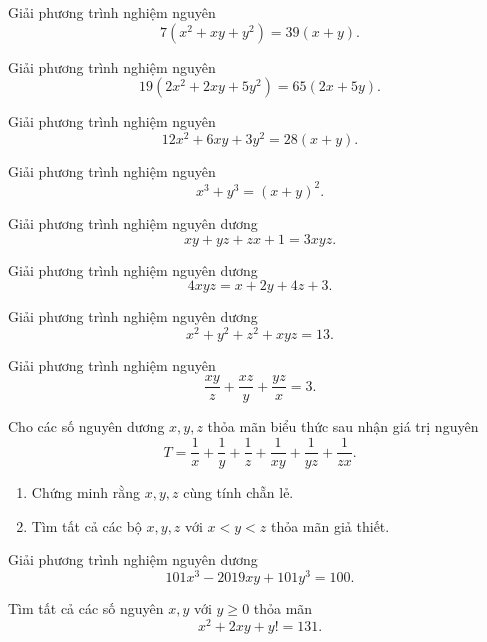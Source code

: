 \begin{btt}
Giải phương trình nghiệm nguyên
$$7\left(x^2+xy+y^2\right)=39\left(x+y\right).$$
\end{btt}

\begin{btt}
Giải phương trình nghiệm nguyên
$$19\left(2x^2+2xy+5y^2\right)=65\left(2x+5y\right).$$
\end{btt}

\begin{btt}
Giải phương trình nghiệm nguyên $$12x^2+6xy+3y^2=28(x+y).$$
\end{btt}

\begin{btt}
Giải phương trình nghiệm nguyên $$x^3+y^3=(x+y)^2.$$
\end{btt}

\begin{btt}
Giải phương trình nghiệm nguyên dương
$$xy+yz+zx+1=3xyz.$$
\end{btt}

\begin{btt}
Giải phương trình nghiệm nguyên dương
\[4xyz=x+2y+4z+3.\]
\end{btt}

\begin{btt}
Giải phương trình nghiệm nguyên dương
\[x^2+y^2+z^2+xyz=13.\]
\end{btt}

\begin{btt}
Giải phương trình nghiệm nguyên
\[\dfrac{xy}{z}+\dfrac{xz}{y}+\dfrac{yz}{x}=3.\]
\end{btt}

\begin{btt}
Cho các số nguyên dương $x,y,z$ thỏa mãn biểu thức sau nhận giá trị nguyên
$$T=\dfrac{1}{x}+\dfrac{1}{y}+\dfrac{1}{z} +\dfrac{1}{xy}+\dfrac{1}{yz}+\dfrac{1}{zx}.$$
\begin{enumerate}[a,]
    \item Chứng minh rằng $x,y,z$ cùng tính chẵn lẻ.
    \item Tìm tất cả các bộ $x,y,z$ với $x<y<z$ thỏa mãn giả thiết.
\end{enumerate}
\end{btt}

\begin{btt}
Giải phương trình nghiệm nguyên dương
$$101x^3-2019xy+101y^3=100.$$
\end{btt}

\begin{btt}
Tìm tất cả các số nguyên $x,y$ với $y\ge 0$ thỏa mãn
\[x^2+2xy+y!=131.\]
\end{btt}

